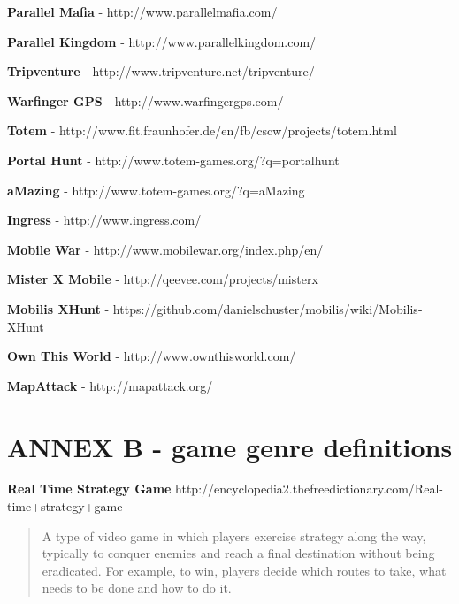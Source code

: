 \documentclass{article}
\begin{document}
\textbf{Parallel Mafia} - http://www.parallelmafia.com/ \newline

\textbf{Parallel Kingdom} - http://www.parallelkingdom.com/ \newline

\textbf{Tripventure} - http://www.tripventure.net/tripventure/ \newline

\textbf{Warfinger GPS} - http://www.warfingergps.com/ \newline

\textbf{Totem} - http://www.fit.fraunhofer.de/en/fb/cscw/projects/totem.html
\newline

\textbf{Portal Hunt} - http://www.totem-games.org/?q=portalhunt \newline

\textbf{aMazing} - http://www.totem-games.org/?q=aMazing \newline

\textbf{Ingress} - http://www.ingress.com/ \newline

\textbf{Mobile War} - http://www.mobilewar.org/index.php/en/ \newline

\textbf{Mister X Mobile} - http://qeevee.com/projects/misterx \newline

\textbf{Mobilis XHunt} - https://github.com/danielschuster/mobilis/wiki/Mobilis-XHunt
\newline

\textbf{Own This World} - http://www.ownthisworld.com/ \newline

\textbf{MapAttack} - http://mapattack.org/ \newline



\section{ANNEX B - game genre definitions}


\textbf{Real Time Strategy Game}		
http://encyclopedia2.thefreedictionary.com/Real-time+strategy+game
\begin{quote}
A type of video game in which players exercise strategy along the way, typically
to conquer enemies and reach a final destination without being eradicated. For
example, to win, players decide which routes to take, what needs to be done and
how to do it.
\end{quote}
\end{document}
